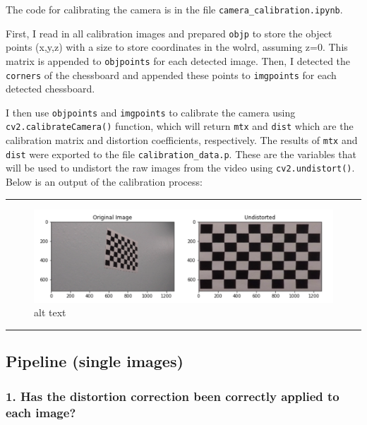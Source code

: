 \documentclass[11pt]{article}
\makeatletter
\def\maxwidth{\ifdim\Gin@nat@width>\linewidth\linewidth
    \else\Gin@nat@width\fi}
\let\Oldincludegraphics\includegraphics
\renewcommand{\includegraphics}[1]{\Oldincludegraphics[width=.8\maxwidth]{#1}}
\makeatother
\begin{document}
The code for calibrating the camera is in the file
\texttt{camera\_calibration.ipynb}.

First, I read in all calibration images and prepared \texttt{objp} to
store the object points (x,y,z) with a size to store coordinates in the
wolrd, assuming z=0. This matrix is appended to \texttt{objpoints} for
each detected image. Then, I detected the \texttt{corners} of the
chessboard and appended these points to \texttt{imgpoints} for each
detected chessboard.

I then use \texttt{objpoints} and \texttt{imgpoints} to calibrate the
camera using \texttt{cv2.calibrateCamera()} function, which will return
\texttt{mtx} and \texttt{dist} which are the calibration matrix and
distortion coefficients, respectively. The results of \texttt{mtx} and
\texttt{dist} were exported to the file \texttt{calibration\_data.p}.
These are the variables that will be used to undistort the raw images
from the video using \texttt{cv2.undistort()}. Below is an output of the
calibration process:

\begin{center}\rule{0.5\linewidth}{\linethickness}\end{center}

\begin{figure}
\centering
\includegraphics{./output_images/writeup_images/cal_example.png}
\caption{alt text}
\end{figure}

\begin{center}\rule{0.5\linewidth}{\linethickness}\end{center}

    \hypertarget{pipeline-single-images}{%
\subsection{Pipeline (single images)}\label{pipeline-single-images}}

\hypertarget{has-the-distortion-correction-been-correctly-applied-to-each-image}{%
\subsubsection{1. Has the distortion correction been correctly applied
to each
image?}\label{has-the-distortion-correction-been-correctly-applied-to-each-image}}
\end{document}
